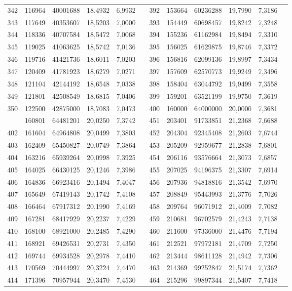\begin{longtable}{p{.17\linewidth}*{11}{S}}
342&116964&40001688&18,4932&6,9932&&392&153664&60236288&19,7990&7,3186\\
343&117649&40353607&18,5203&7,0000&&393&154449&60698457&19,8242&7,3248\\
344&118336&40707584&18,5472&7,0068&&394&155236&61162984&19,8494&7,3310\\
345&119025&41063625&18,5742&7,0136&&395&156025&61629875&19,8746&7,3372\\
346&119716&41421736&18,6011&7,0203&&396&156816&62099136&19,8997&7,3434\\
347&120409&41781923&18,6279&7,0271&&397&157609&62570773&19,9249&7,3496\\
348&121104&42144192&18,6548&7,0338&&398&158404&63044792&19,9499&7,3558\\
349&121801&42508549&18,6815&7,0406&&399&159201&63521199&19,9750&7,3619\\
350&122500&42875000&18,7083&7,0473&&400&160000&64000000&20,0000&7,3681\\
&160801&64481201&20,0250&7,3742&&451&203401&91733851&21,2368&7,6688\\
402&161604&64964808&20,0499&7,3803&&452&204304&92345408&21,2603&7,6744\\
403&162409&65450827&20,0749&7,3864&&453&205209&92959677&21,2838&7,6801\\
404&163216&65939264&20,0998&7,3925&&454&206116&93576664&21,3073&7,6857\\
405&164025&66430125&20,1246&7,3986&&455&207025&94196375&21,3307&7,6914\\
406&164836&66923416&20,1494&7,4047&&456&207936&94818816&21,3542&7,6970\\
407&165649&67419143&20,1742&7,4108&&457&208849&95443993&21,3776&7,7026\\
408&166464&67917312&20,1990&7,4169&&458&209764&96071912&21,4009&7,7082\\
409&167281&68417929&20,2237&7,4229&&459&210681&96702579&21,4243&7,7138\\
410&168100&68921000&20,2485&7,4290&&460&211600&97336000&21,4476&7,7194\\
411&168921&69426531&20,2731&7,4350&&461&212521&97972181&21,4709&7,7250\\
412&169744&69934528&20,2978&7,4410&&462&213444&98611128&21,4942&7,7306\\
413&170569&70444997&20,3224&7,4470&&463&214369&99252847&21,5174&7,7362\\
414&171396&70957944&20,3470&7,4530&&464&215296&99897344&21,5407&7,7418\\

\end{longtable}

